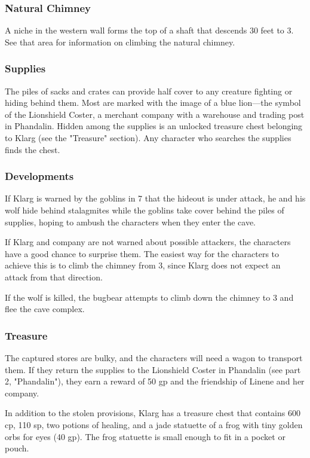 \documentclass[10pt,a4paper,twoside,bg=print,twocolumn,openany,nodeprecatedcode]{dndbook}
\begin{document}
\subsubsection{Natural Chimney}
A niche in the western wall forms the top of a shaft that descends 30 feet to 3. See that area for information on climbing the natural chimney.

\subsubsection{Supplies}
The piles of sacks and crates can provide half cover to any creature fighting or hiding behind them. Most are marked with the image of a blue lion—the symbol of the Lionshield Coster, a merchant company with a warehouse and trading post in Phandalin. Hidden among the supplies is an unlocked treasure chest belonging to Klarg (see the "Treasure" section). Any character who searches the supplies finds the chest.

\subsubsection{Developments}
If Klarg is warned by the goblins in 7 that the hideout is under attack, he and his wolf hide behind stalagmites while the goblins take cover behind the piles of supplies, hoping to ambush the characters when they enter the cave.

If Klarg and company are not warned about possible attackers, the characters have a good chance to surprise them. The easiest way for the characters to achieve this is to climb the chimney from 3, since Klarg does not expect an attack from that direction.

If the wolf is killed, the bugbear attempts to climb down the chimney to 3 and flee the cave complex.

\subsubsection{Treasure}
The captured stores are bulky, and the characters will need a wagon to transport them. If they return the supplies to the Lionshield Coster in Phandalin (see part 2, "Phandalin"), they earn a reward of 50 gp and the friendship of Linene and her company.

In addition to the stolen provisions, Klarg has a treasure chest that contains 600 cp, 110 sp, two potions of healing, and a jade statuette of a frog with tiny golden orbs for eyes (40 gp). The frog statuette is small enough to fit in a pocket or pouch.
\end{document}
